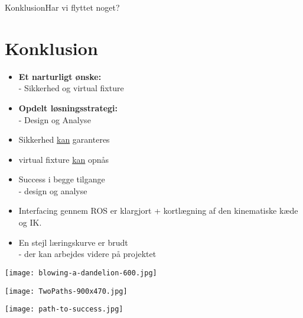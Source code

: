 \begin{frame}{Konklusion}{Har vi flyttet noget?}
\section{Konklusion}
\begin{minipage}{0.6\textwidth}
\begin{block}{}
	\begin{itemize}
		\item \textbf{Et narturligt ønske:}\\ - Sikkerhed og virtual fixture
		\item \textbf{Opdelt løsningsstrategi:}\\ - Design og Analyse 
		\vspace{0.3cm}
		\item Sikkerhed \underline{kan} garanteres
		\item virtual fixture \underline{kan} opnås
		\item Success i begge tilgange \\
		\scriptsize - design og analyse
		\item \normalsize Interfacing gennem ROS er klargjort + kortlægning af den kinematiske kæde og IK.
		\item En stejl læringskurve er brudt \\ 
		\scriptsize - der kan arbejdes videre på projektet
	\end{itemize}
\end{block}
\end{minipage}
\begin{minipage}{0.35\textwidth}
\texttt{[image: blowing-a-dandelion-600.jpg]}
\vspace*{0.2cm}

\texttt{[image: TwoPaths-900x470.jpg]}
\vspace*{0.2cm}

\texttt{[image: path-to-success.jpg]}
\end{minipage}
\end{frame}

